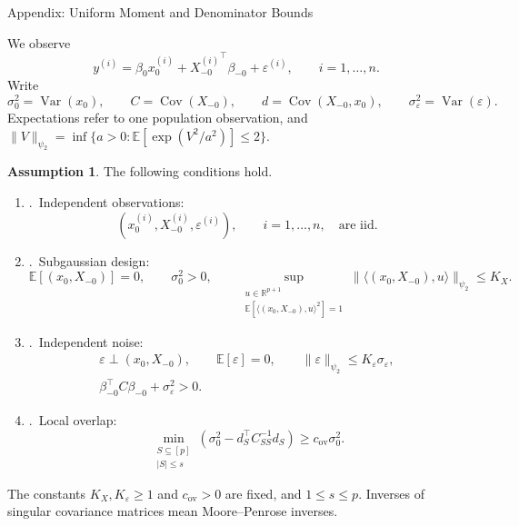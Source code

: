 \documentclass[a4paper,10pt,english]{article}
\theoremstyle{definition}
\newtheorem{assumption}{Assumption}
\DeclareMathOperator{\Var}{Var}
\DeclareMathOperator{\Cov}{Cov}
\begin{document}
\begin{center}
\Large Appendix: Uniform Moment and Denominator Bounds
\end{center}
\medskip

\begin{review}
We observe
\begin{equation}\label{eq:new-model}
 y^{(i)}
 =\beta_0x_0^{(i)}
 +{X_{-0}^{(i)}}^\top\beta_{-0}
 +\varepsilon^{(i)},
 \qquad i=1,\ldots,n.
\end{equation}
\rbreak
Write
\[
 \sigma_0^2=\Var(x_0),\qquad
 C=\Cov(X_{-0}),\qquad
 d=\Cov(X_{-0},x_0),\qquad
 \sigma_\varepsilon^2=\Var(\varepsilon).
\]
\rbreak
Expectations refer to one population observation, and
\(\|V\|_{\psi_2}
 =\inf\{a>0:\mathbb E[\exp(V^2/a^2)]\le2\}\).

\begin{assumption}\label{ass:new}
The following conditions hold.
\begin{enumerate}
\renewcommand{\labelenumi}{}
\item \theenumi.\ Independent observations:
\begin{equation*}\tag{A1}\label{ass:new-iid}
 (x_0^{(i)},X_{-0}^{(i)},\varepsilon^{(i)}),
 \qquad i=1,\ldots,n,
 \quad\text{are iid.}
\end{equation*}
\item \theenumi.\ Subgaussian design:
\begin{equation*}\tag{A2}\label{ass:new-design}
 \mathbb E[(x_0,X_{-0})]=0,\qquad
 \sigma_0^2>0,\qquad
 \sup_{\substack{u\in\mathbb R^{p+1}\\
 \mathbb E[\langle(x_0,X_{-0}),u\rangle^2]=1}}
 \|\langle(x_0,X_{-0}),u\rangle\|_{\psi_2}
 \le K_X.
\end{equation*}
\item \theenumi.\ Independent noise:
\begin{equation*}\tag{A3}\label{ass:new-noise}
 \begin{gathered}
 \varepsilon\perp(x_0,X_{-0}),\qquad
 \mathbb E[\varepsilon]=0,\qquad
 \|\varepsilon\|_{\psi_2}\le K_\varepsilon\sigma_\varepsilon,\\
 \beta_{-0}^\top C\beta_{-0}+\sigma_\varepsilon^2>0.
 \end{gathered}
\end{equation*}
\item \theenumi.\ Local overlap:
\begin{equation*}\tag{A4}\label{ass:new-overlap}
 \min_{\substack{S\subseteq[p]\\|S|\le s}}
 \left(\sigma_0^2-d_S^\top C_{SS}^{-1}d_S\right)
 \ge c_{\mathrm{ov}}\sigma_0^2.
\end{equation*}
\end{enumerate}
The constants \(K_X,K_\varepsilon\ge1\) and
\(c_{\mathrm{ov}}>0\) are fixed, and \(1\le s\le p\).
\rbreak
Inverses of singular covariance matrices mean Moore--Penrose inverses.
\end{assumption}


\end{review}
\end{document}
